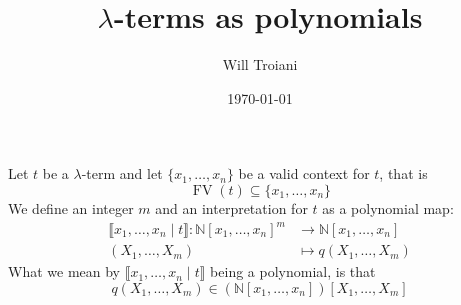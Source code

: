 \documentclass[12pt]{article}
\title{$\lambda$-terms as polynomials}
\author{Will Troiani}
\date{\today}
\theoremstyle{plain}
\theoremstyle{definition}
\newcommand{\bb}[1]{\mathbb{#1}}
\newcommand{\lto}{\longrightarrow}
\begin{document}
	\maketitle
	Let $t$ be a $\lambda$-term and let $\{ x_1, \ldots, x_n \}$ be a valid context for $t$, that is
	\begin{equation}
		\operatorname{FV}(t) \subseteq \{ x_1, \ldots, x_n \}
	\end{equation}
We define an integer $m$ and an interpretation for $t$ as a polynomial map:
	\begin{align*}
		\llbracket x_1, \ldots, x_n \mid t \rrbracket: \bb{N}[x_1, \ldots, x_n]^{m} &\lto \bb{N}[x_1,\ldots, x_n]\\
		(X_1, \ldots, X_{m}) &\longmapsto q(X_1, \ldots, X_{m})
	\end{align*}
	What we mean by $\llbracket x_1, \ldots, x_n \mid t \rrbracket$ being a polynomial, is that
	\begin{equation}
		q(X_1, \ldots, X_{m}) \in (\bb{N}[x_1, \ldots, x_n])[X_1, \ldots, X_{m}]
	\end{equation}
	
\end{document}
